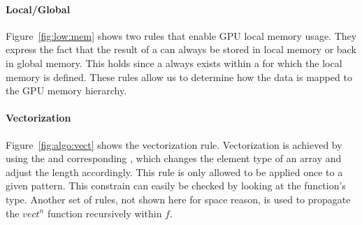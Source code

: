 \paragraph{Local/Global}
Figure~\ref{fig:low:mem} shows two rules that enable GPU local memory usage.
They express the fact that the result of a  can always be stored in local memory or back in global memory.
This holds since a  always exists within a  for which the local memory is defined.
These rules allow us to determine how the data is mapped to the GPU memory hierarchy.



\paragraph{Vectorization}
Figure~\ref{fig:algo:vect} shows the vectorization rule.
Vectorization is achieved by using the  and corresponding , which changes the element type of an array and adjust the length accordingly.
This rule is only allowed to be applied once to a given  pattern.
This constrain can easily be checked by looking at the function's type. %
Another set of rules, not shown here for space reason, is used to propagate the $vect^n$ function recursively within $f$.

%
%

